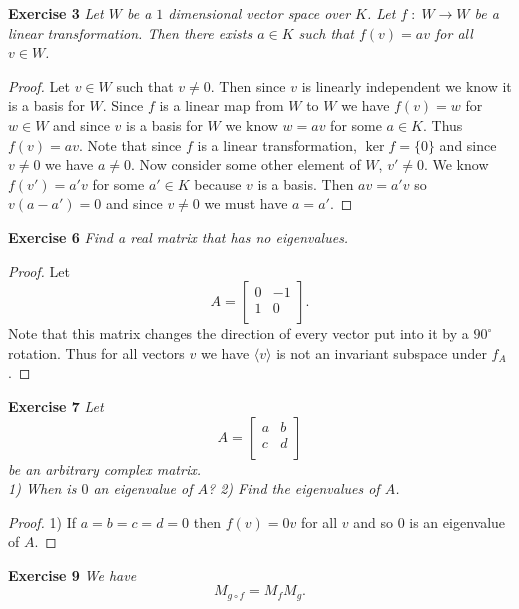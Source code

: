 \documentclass{article}
\begin{document}
\begin{flushleft}
\textbf{Exercise 3}
\textsl{Let $W$ be a $1$ dimensional vector space over $K$. Let $f \; : \; W \rightarrow W$ be a linear transformation. Then there exists $a \in K$ such that $f(v) = av$ for all $v \in W$.}
\begin{proof}
Let $v \in W$ such that $v \neq 0$. Then since $v$ is linearly independent we know it is a basis for $W$. Since $f$ is a linear map from $W$ to $W$ we have $f(v) = w$ for $w \in W$ and since $v$ is a basis for $W$ we know $w = av$ for some $a \in K$. Thus $f(v) = av$. Note that since $f$ is a linear transformation, $\ker f = \{0\}$ and since $v \neq 0$ we have $a \neq 0$. Now consider some other element of $W$, $v' \neq 0$. We know $f(v') = a'v$ for some $a' \in K$ because $v$ is a basis. Then $av = a'v$ so $v(a-a') = 0$ and since $v \neq 0$ we must have $a = a'$.
\end{proof}

\textbf{Exercise 6}
\textsl{Find a real matrix that has no eigenvalues.}
\begin{proof}
Let
\[
A=
\left [
\begin{array}{cc}
0 & -1 \\
1 & 0 \\
\end{array}
\right ].
\]
Note that this matrix changes the direction of every vector put into it by a $90^{\circ}$ rotation. Thus for all vectors $v$ we have $\langle v \rangle$ is not an invariant subspace under $f_A$.
\end{proof}

\textbf{Exercise 7}
\textsl{Let
\[
A=
\left [
\begin{array}{cc}
a & b\\
c & d\\
\end{array}
\right ]
\]
be an arbitrary complex matrix.\\
1) When is $0$ an eigenvalue of $A$?
2) Find the eigenvalues of $A$.}
\begin{proof}
1) If $a=b=c=d=0$ then $f(v) = 0v$ for all $v$ and so $0$ is an eigenvalue of $A$.
\end{proof}

\textbf{Exercise 9}
\textsl{We have
\[
M_{g \circ f} = M_f M_g.
\]}


\end{flushleft}
\end{document}
